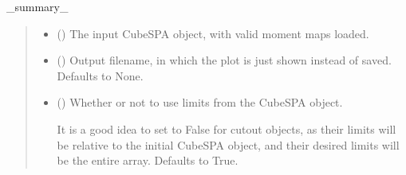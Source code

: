 \documentclass[letterpaper,10pt,english]{sphinxmanual}
\begin{document}
\begin{fulllineitems}
\label{\detokenize{momentmaps:cubespa.plotting.mommap_plots.moment_map_plot}}
\pysigstartsignatures
{}
\pysigstopsignatures
\sphinxAtStartPar
\_summary\_
\begin{quote}\begin{description}
\begin{itemize}
\item {} 
\sphinxAtStartPar
{} ({\hyperref[\detokenize{getting_started:cubespa.cubespa.CubeSPA}]{}}) \textendash{} The input CubeSPA object, with valid moment maps loaded.

\item {} 
\sphinxAtStartPar
{} (\sphinxstyleliteralemphasis{\sphinxupquote{, }}) \textendash{} Output filename, in which the plot is just shown instead of saved. Defaults to None.

\item {} 
\sphinxAtStartPar
{} (\sphinxstyleliteralemphasis{\sphinxupquote{, }}) \textendash{} 
\sphinxAtStartPar
Whether or not to use limits from the CubeSPA object.

\sphinxAtStartPar
It is a good idea to set to False for cutout objects, as their limits will be relative to the initial CubeSPA object,
and their desired limits will be the entire array. Defaults to True.


\end{itemize}

\end{description}\end{quote}

\end{fulllineitems}


\sphinxstepscope
\end{document}

